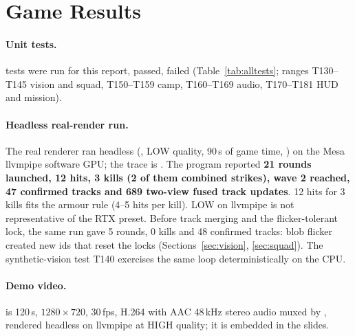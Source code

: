 \section{Game Results}\label{sec:v5results}
\paragraph{Unit tests.} \nTests{} tests were run for this report, \nPass{} passed, \nFail{} failed (Table~\ref{tab:alltests}; ranges T130--T145 vision and squad, T150--T159 camp, T160--T169 audio, T170--T181 HUD and mission).

\paragraph{Headless real-render run.} The real renderer ran headless (, LOW quality, 90\,s of game time, ) on the Mesa llvmpipe software GPU; the trace is . The program reported \textbf{21 rounds launched, 12 hits, 3 kills (2 of them
combined strikes), wave 2 reached, 47 confirmed tracks and 689 two-view fused track updates}. 12 hits for 3 kills fits the armour rule (4--5 hits per kill). LOW on llvmpipe is not representative of the RTX preset. Before track merging and the flicker-tolerant lock, the same run gave 5 rounds, 0 kills and 48 confirmed tracks: blob flicker created new ids that reset the locks (Sections~\ref{sec:vision}, \ref{sec:squad}). The synthetic-vision test T140 exercises the same loop deterministically on the CPU.

\paragraph{Demo video.}  is 120\,s, $1280\times720$, 30\,fps, H.264 with AAC 48\,kHz stereo audio muxed by , rendered headless on llvmpipe at HIGH quality; it is embedded in the slides.

